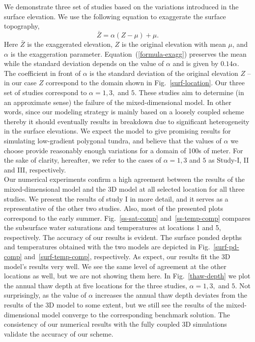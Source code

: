 \documentclass[review]{elsarticle}
\begin{document}
We demonstrate three set of studies based on the variations introduced in the surface elevation. We use the following equation to exaggerate the surface topography,
\begin{equation}\label{formula-exagg}
\bar{Z} =  \alpha (Z - \mu) + \mu.
\end{equation}
Here $\bar{Z}$ is the exaggerated elevation, $Z$ is the original elevation with mean $\mu$, and $\alpha$ is the exaggeration parameter. Equation~(\ref{formula-exagg})  preserves the mean while the standard deviation depends on the value of $\alpha$ and is given by $0.14 \alpha$. The coefficient in front of $\alpha$ is the standard deviation of the original elevation $Z$ -- in our case $Z$ correspond to the domain shown in Fig.~\ref{surf-location}. Our three set of studies correspond to $\alpha=1,3,$ and $5$.
These studies aim to determine (in an approximate sense) the failure of the mixed-dimensional model. In other words, since our modeling strategy is mainly based on a loosely coupled scheme thereby it should eventually results in breakdown due to significant heterogeneity in the surface elevations. We expect the model to give promising results for simulating low-gradient polygonal tundra, and believe that the values of $\alpha$ we choose provide reasonably enough variations for a domain of 100s of meter. For the sake of clarity, hereafter, we refer to the cases of $\alpha = 1, 3$ and $5$ as Study-I, II and III, respectively. \\
Our numerical experiments confirm a high agreement between the results of the mixed-dimensional model and the 3D model at all selected location for all three studies. We present the results of study I in more detail, and it serves as a representative of the other two studies. Also, most of the presented plots correspond to the early summer. Fig.~\ref{ss-sat-comp} and~\ref{ss-temp-comp} compares the subsurface water saturations and temperatures at locations 1 and 5, respectively. The accuracy of our results is evident. The surface ponded depths and temperatures obtained with the two models are depicted in Fig.~\ref{surf-pd-comp} and~\ref{surf-temp-comp}, respectively. As expect, our results fit the 3D model's results very well. We see the same level of agreement at the other locations as well, but we are not showing them here.
In Fig.~\ref{thaw-depth} we plot the annual thaw depth at five locations for the three studies, $\alpha =1, 3,$ and $5$. 
Not surprisingly, as the value of $\alpha$ increases the annual thaw depth deviates from the results of the 3D model to some extent, but we still see the results of the mixed-dimensional model converge to the corresponding benchmark solution. The consistency of our numerical results with the fully coupled 3D simulations validate the accuracy of our scheme. 
\end{document}

